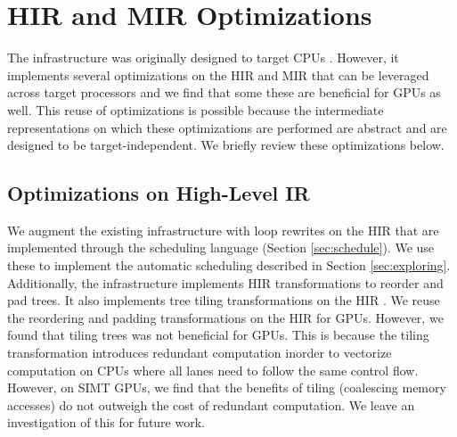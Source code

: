 \section{HIR and MIR Optimizations}


The \TreebeardOLD{} infrastructure was originally designed to target CPUs \cite{Treebeard}. 
However, it implements several optimizations on the HIR and MIR that 
can be leveraged across target processors and we find that some these 
are beneficial for GPUs as well. This reuse of optimizations is possible 
because the intermediate representations on which these optimizations are performed 
are abstract and are designed to be target-independent. We briefly review these 
optimizations below. 

\subsection{Optimizations on High-Level IR}
We augment the existing \TreebeardOLD{} infrastructure with loop rewrites on 
the HIR that are implemented through the scheduling language (Section \ref{sec:schedule}).
We use these to implement the automatic scheduling described in Section \ref{sec:exploring}. 
Additionally, the \TreebeardOLD{} infrastructure implements HIR transformations to reorder and pad 
trees. It also implements tree tiling transformations on the HIR \cite{Treebeard}. We reuse the 
reordering and padding transformations on the HIR for GPUs. However, we found that 
tiling trees was not beneficial for GPUs. This is because the tiling transformation
introduces redundant computation inorder to vectorize computation on CPUs where 
all lanes need to follow the same control flow. However, on SIMT GPUs, we find that 
the benefits of tiling (coalescing memory accesses) do not outweigh the cost of
redundant computation. We leave an investigation of this for future work.

